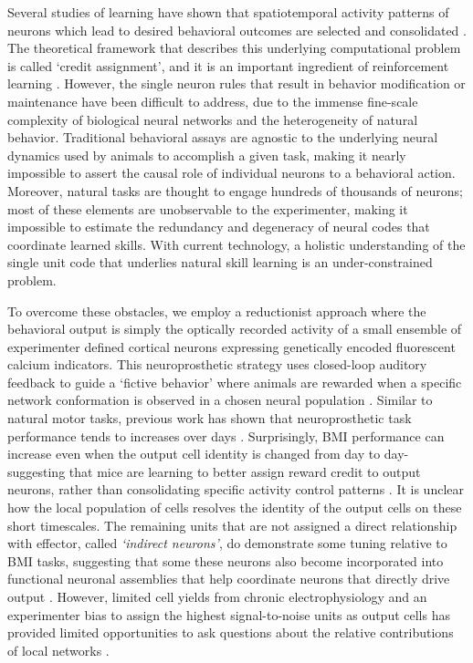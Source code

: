 \documentclass[letterpaper, 10 pt, conference]{ieeeconf}  %
\begin{document}
Several studies of learning have shown that spatiotemporal activity patterns of neurons which lead to desired behavioral outcomes are selected and consolidated \cite{Fetz1969-pt,Ganguly2009-qy,Athalye2018-lo}. The theoretical framework that describes this underlying computational problem is called `credit assignment', and it is an important ingredient of reinforcement learning \cite{Sutton1998-bm}. However, the single neuron rules that result in behavior modification or maintenance have been difficult to address, due to the immense fine-scale complexity of biological neural networks and the heterogeneity of natural behavior. Traditional behavioral assays are agnostic to the underlying neural dynamics used by animals to accomplish a given task, making it nearly impossible to assert the causal role of individual neurons to a behavioral action. Moreover, natural tasks are thought to engage hundreds of thousands of neurons; most of these elements are unobservable to the experimenter, making it impossible to estimate the redundancy and degeneracy of neural codes that coordinate learned skills. With current technology, a holistic understanding of the single unit code that underlies natural skill learning is an under-constrained problem.

 To overcome these obstacles, we employ a reductionist approach where the behavioral output is simply the optically recorded activity of a small ensemble of experimenter defined cortical neurons expressing genetically encoded fluorescent calcium indicators. This neuroprosthetic strategy uses closed-loop auditory feedback to guide a `fictive behavior' where animals are rewarded when a specific network conformation is observed in a chosen neural population \cite{Clancy2014-ju,Grosenick2015-hy}. Similar to natural motor tasks, previous work has shown that neuroprosthetic task performance tends to increases over days \cite{Clancy2014-ju}. Surprisingly, BMI performance can increase even when the output cell identity is changed from day to day-  suggesting that mice are learning to better assign reward credit to output neurons, rather than consolidating specific activity control patterns \cite{Peters2014-xd,Gulati2017-rz,Mitani2018-rp}. It is unclear how the local population of cells resolves the identity of the output cells on these short timescales.  The remaining units that are not assigned a direct relationship with effector, called  \emph{`indirect neurons'}, do demonstrate some tuning relative to BMI tasks, suggesting that some these neurons also become incorporated into functional neuronal assemblies that help coordinate neurons that directly drive output \cite{Prsa2017-rn,Ganguly2011-je}. However, limited cell yields from chronic electrophysiology and an experimenter bias to assign the highest signal-to-noise units as output cells has provided limited opportunities to ask questions about the relative contributions of local networks \cite{Ganguly2011-je}.
\end{document}
